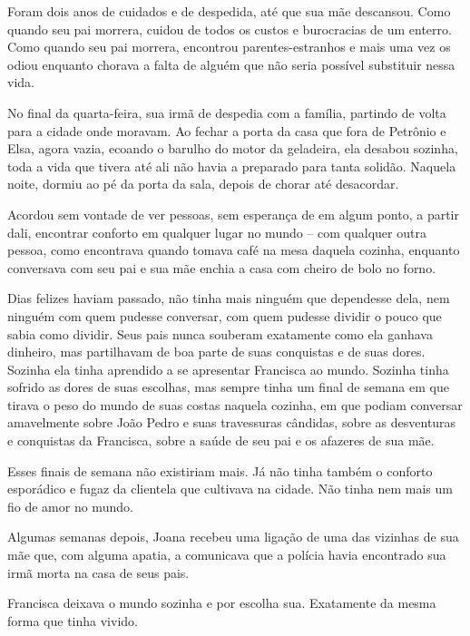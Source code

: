 \documentclass[11pt,a4paper,twoside,openany]{book}
\begin{document}
Foram dois anos de cuidados e de despedida, até que sua mãe descansou. Como quando seu pai morrera, cuidou de todos os custos e burocracias de um enterro. Como quando seu pai morrera, encontrou parentes-estranhos e mais uma vez os odiou enquanto chorava a falta de alguém que não seria possível substituir nessa vida.

No final da quarta-feira, sua irmã de despedia com a família, partindo de volta para a cidade onde moravam. Ao fechar a porta da casa que fora de Petrônio e Elsa, agora vazia, ecoando o barulho do motor da geladeira, ela desabou sozinha, toda a vida que tivera até ali não havia a preparado para tanta solidão. Naquela noite, dormiu ao pé da porta da sala, depois de chorar até desacordar.

Acordou sem vontade de ver pessoas, sem esperança de em algum ponto, a partir dali, encontrar conforto em qualquer lugar no mundo – com qualquer outra pessoa, como encontrava quando tomava café na mesa daquela cozinha, enquanto conversava com seu pai e sua mãe enchia a casa com cheiro de bolo no forno.

Dias felizes haviam passado, não tinha mais ninguém que dependesse dela, nem ninguém com quem pudesse conversar, com quem pudesse dividir o pouco que sabia como dividir. Seus pais nunca souberam exatamente como ela ganhava dinheiro, mas partilhavam de boa parte de suas conquistas e de suas dores. Sozinha ela tinha aprendido a se apresentar Francisca ao mundo. Sozinha tinha sofrido as dores de suas escolhas, mas sempre tinha um final de semana em que tirava o peso do mundo de suas costas naquela cozinha, em que podiam conversar amavelmente sobre João Pedro e suas travessuras cândidas, sobre as desventuras e conquistas da Francisca, sobre a saúde de seu pai e os afazeres de sua mãe.

Esses finais de semana não existiriam mais. Já não tinha também o conforto esporádico e fugaz da clientela que cultivava na cidade. Não tinha nem mais um fio de amor no mundo.

Algumas semanas depois, Joana recebeu uma ligação de uma das vizinhas de sua mãe que, com alguma apatia, a comunicava que a polícia havia encontrado sua irmã morta na casa de seus pais.

Francisca deixava o mundo sozinha e por escolha sua. Exatamente da mesma forma que tinha vivido.
\end{document}
